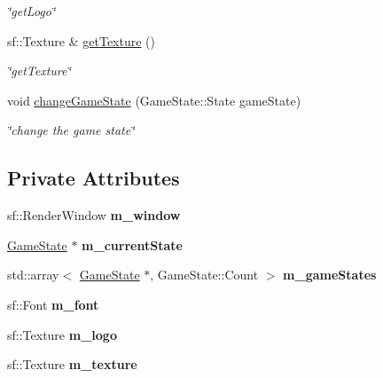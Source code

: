 \begin{DoxyCompactItemize}
\begin{DoxyCompactList}\small\item\em \char`\"{}get\+Logo\char`\"{} \end{DoxyCompactList}\item 
sf\+::\+Texture \& \hyperlink{classGame_aa231abe1d7a36b55599ca459c815b2a5}{get\+Texture} ()
\begin{DoxyCompactList}\small\item\em \char`\"{}get\+Texture\char`\"{} \end{DoxyCompactList}\item 
void \hyperlink{classGame_a01f4a9f62ec168cc507b45c26cba8d7b}{change\+Game\+State} (Game\+State\+::\+State game\+State)
\begin{DoxyCompactList}\small\item\em \char`\"{}change the game state\char`\"{} \end{DoxyCompactList}\end{DoxyCompactItemize}
\subsection*{Private Attributes}
\begin{DoxyCompactItemize}
\item 
\mbox{\label{classGame_a22a61b5ea27c609be8cf2724c33d7ae5}} 
sf\+::\+Render\+Window {\bfseries m\+\_\+window}
\item 
\mbox{\label{classGame_acb27bf091b20840bcc0d1afab9cfdd9a}} 
\hyperlink{classGameState}{Game\+State} $\ast$ {\bfseries m\+\_\+current\+State}
\item 
\mbox{\label{classGame_afa41b50e60afb028ef72dc1a0f5f3c14}} 
std\+::array$<$ \hyperlink{classGameState}{Game\+State} $\ast$, Game\+State\+::\+Count $>$ {\bfseries m\+\_\+game\+States}
\item 
\mbox{\label{classGame_af5c5c39d0eabe68c3bfff3509900a489}} 
sf\+::\+Font {\bfseries m\+\_\+font}
\item 
\mbox{\label{classGame_a096d1db71ac79951a635b7ffb6266ca3}} 
sf\+::\+Texture {\bfseries m\+\_\+logo}
\item 
\mbox{\label{classGame_ab9b34c0dd4f04f242c21a3104d20bf4a}} 
sf\+::\+Texture {\bfseries m\+\_\+texture}
\end{DoxyCompactItemize}


